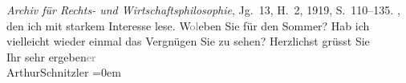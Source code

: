 \begin{ledgroupsized}[t]{13cm}
{{{                        \emph{Archiv für Rechts- und
                        Wirtschaftsphilosophie}, Jg. 13, H. 2, 1919, S. 110–135.
                  }}}\label{K_L02341_1h}, den ich mit starkem Interesse lese.\pend
           \pstart
           W\textcolor{gray}{o}\textcolor{gray}{l}eben Sie für den Sommer? Hab ich vielleicht wieder einmal das
               Vergnügen Sie zu sehen?\pend
           \pstart
           Herzlichst grüsst Sie{\\[\baselineskip]}Ihr sehr ergeben\textcolor{gray}{er}{\\[\baselineskip]}\spacefill\mbox{ArthurSchnitzler}\pend
           \leftskip=0em{}
         
         \endnumbering{}\end{ledgroupsized}  \newcommand{\dateiname}{L02341}\newcommand{\titel}{Arthur Schnitzler an Robert Adam, 12. 6. 1920}\newcommand{\editorInnen}{Martin Anton Müller und Gerd-Hermann Susen}
      